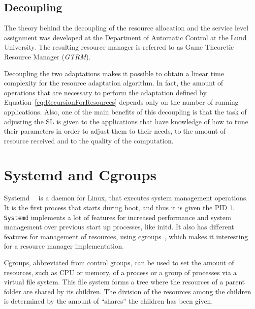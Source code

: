 \documentclass[nobiblatex]{LTHthesis}
\begin{document}
\subsection{Decoupling}

The theory behind the decoupling of the resource allocation and the service
level assignment was developed at the Department of Automatic Control at
the Lund University. The resulting resource manager is referred to as Game 
Theoretic Resource Manager (\emph{GTRM}).

Decoupling the two adaptations makes it possible to obtain a linear time
complexity for the resource adaptation algorithm. In fact, the amount of
operations that are necessary to perform the adaptation defined by
Equation~\ref{eq:RecursionForResources} depends only on the number of
running applications. Also, one of the main benefits of this decoupling is
that the task of adjusting the SL is given to the applications that have
knowledge of how to tune their parameters in order to adjust them to their
needs, to the amount of resource received and to the quality of the 
computation.

\section{Systemd and Cgroups}
\label{sec:systemdandcroups}
Systemd~\cite{sysd1}~\cite{sysd2} is a daemon for Linux, that executes system
management operations. It is the first process that starts during boot, and 
thus it is given the PID 1. \texttt{Systemd} implements a lot of features for increased
performance and system management over previous start up processes, like
initd. It also has different features for management of resources, using
cgroups~\cite{cgroups}, which makes it interesting for a resource manager
implementation. 

Cgroups, abbreviated from control groups, can be used to set
the amount of resources, such as CPU or memory, of a process or a group of
processes via a virtual file system. This file system forms a tree where the
resources of a parent folder are shared by its children. The division of the
resources among the children is determined by the amount of ``shares'' the
children has been given. 
\end{document}
